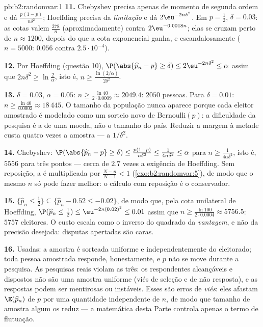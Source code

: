 \begin{solution}{pb:b2:randomvar:1}
\textbf{11.} Chebyshev precisa apenas de momento de segunda ordem e dá
$\frac{p(1-p)}{n\delta^2}$; Hoeffding precisa da
\emph{limitação} e dá $2\eu^{-2n\delta^2}$. Em $p =
\frac12$, $\delta = 0.03$: as cotas valem
$\frac{278}{n}$ (aproximadamente) contra
$2\eu^{-0.0018n}$; elas se cruzam perto de $n \approx 1200$, depois do que
a cota exponencial ganha, e escandalosamente ($n = 5000$:
$0.056$ contra $2.5\cdot10^{-4}$).

\textbf{12.} Por Hoeffding (questão 10), $\P(\abs{\widehat
p_n - p} \geq \delta) \leq 2\eu^{-2n\delta^2} \leq \alpha$ assim
que $2n\delta^2 \geq \ln\frac2\alpha$, isto é, $n \geq
\frac{\ln(2/\alpha)}{2\delta^2}$.

\textbf{13.} $\delta = 0.03$, $\alpha = 0.05$: $n \geq
\frac{\ln 40}{2\cdot0.0009} \approx 2049.4$: $2050$ pessoas.
Para $\delta = 0.01$: $n \geq \frac{\ln40}{0.0002} \approx
18\,445$. O tamanho da população nunca aparece porque cada
eleitor amostrado é modelado como um sorteio novo de Bernoulli$(p)$: a
dificuldade da pesquisa é a  de uma moeda, não o tamanho
do país. Reduzir a margem à metade custa quatro vezes a amostra
--- a  $1/\delta^2$.

\textbf{14.} Chebyshev: $\P(\abs{\widehat p_n - p} \geq
\delta) \leq \frac{p(1-p)}{n\delta^2} \leq
\frac1{4n\delta^2} \leq \alpha$ para $n \geq
\frac1{4\alpha\delta^2}$, isto é, $5556$ para três pontos ---
cerca de $2.7$ vezes a exigência de Hoeffding. Sem
reposição, a  é multiplicada por $\frac{N -
n}{N-1} < 1$ (\cref{exo:b2:randomvar:5}), de modo que o mesmo $n$ só pode
fazer melhor: o cálculo com reposição é o
conservador.

\textbf{15.} $\{\widehat p_n \leq \frac12\} \subseteq
\{\widehat p_n - 0.52 \leq -0.02\}$, de modo que, pela cota unilateral
de Hoeffding, $\P(\widehat p_n \leq \tfrac12) \leq
\eu^{-2n(0.02)^2} \leq 0.01$ assim que $n \geq \frac{\ln
100}{2\cdot0.0004} \approx 5756.5$: $5757$ eleitores. O custo
escala como o inverso do quadrado da \emph{vantagem}, e não da
precisão desejada: disputas apertadas são caras.

\textbf{16.} Usadas: a amostra é sorteada uniforme e
independentemente do eleitorado; toda pessoa amostrada
responde, honestamente, e $p$ não se move durante a pesquisa. As pesquisas
reais violam as três: os respondentes alcançáveis e dispostos
não são uma amostra uniforme (viés de seleção e de não resposta),
e as respostas podem ser mentirosas ou instáveis. Esses são
erros de \emph{viés}: eles afastam $\E(\widehat p_n)$ de
$p$ por uma quantidade independente de $n$, de modo que tamanho de amostra algum
os reduz --- a matemática desta Parte controla apenas
o termo de flutuação.


\end{solution}
